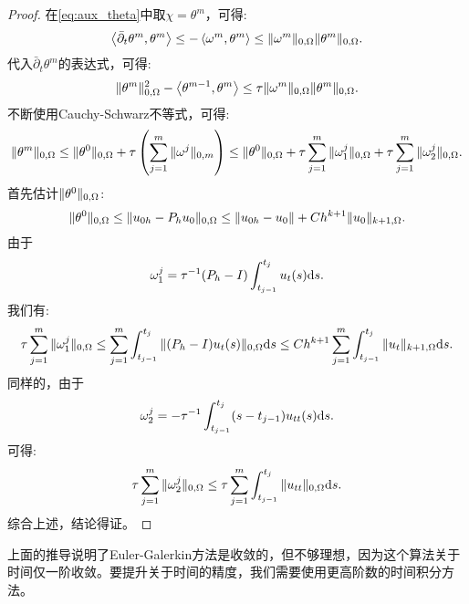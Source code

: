\begin{proof}
    在\eqref{eq:aux_theta}中取$\chi=\theta^{m}$，可得:
    \begin{equation}
        \left<\bar{\partial}_{t}\theta^{m},\theta^{m}\right>\le-\left<\omega^{m},\theta^{m}\right>\le\|\omega^{m}\|_{0,\Omega}\|\theta^{m}\|_{0,\Omega}.
    \end{equation}
    代入$\bar{\partial}_{t}\theta^{m}$的表达式，可得:
    \begin{equation}
        \|\theta^{m}\|_{0,\Omega}^{2}-\left<\theta^{m-1},\theta^{m}\right>\le\tau\|\omega^{m}\|_{0,\Omega}\|\theta^{m}\|_{0,\Omega}.
    \end{equation}
    不断使用Cauchy-Schwarz不等式，可得:
    \begin{equation}
        \|\theta^{m}\|_{0,\Omega}\le\|\theta^{0}\|_{0,\Omega}+\tau\left(\sum_{j=1}^{m}\|\omega^{j}\|_{0,m}\right)\le\|\theta^{0}\|_{0,\Omega}+\tau\sum_{j=1}^{m}\|\omega_{1}^{j}\|_{0,\Omega}+\tau\sum_{j=1}^{m}\|\omega_{2}^{j}\|_{0,\Omega}.
    \end{equation}
    首先估计$\|\theta^{0}\|_{0,\Omega}$:
    \begin{equation}
        \|\theta^{0}\|_{0,\Omega}\le\|u_{0h}-P_{h}u_{0}\|_{0,\Omega}\le\|u_{0h}-u_{0}\|+Ch^{k+1}\|u_{0}\|_{k+1,\Omega}.
    \end{equation}
    由于
    \begin{equation}
        \omega_{1}^{j}=\tau^{-1}(P_{h}-I)\int_{t_{j-1}}^{t_{j}}u_{t}(s)\mathrm{d} s.
    \end{equation}
    我们有:
    \begin{equation}
        \tau\sum_{j=1}^{m}\|\omega_{1}^{j}\|_{0,\Omega}\le\sum_{j=1}^{m}\int_{t_{j-1}}^{t_{j}}\|(P_{h}-I)u_{t}(s)\|_{0,\Omega}\mathrm{d} s\le Ch^{k+1}\sum_{j=1}^{m}\int_{t_{j-1}}^{t_{j}}\|u_{t}\|_{k+1,\Omega}\mathrm{d} s.
    \end{equation}
    同样的，由于
    \begin{equation}
        \omega_{2}^{j}=-\tau^{-1}\int_{t_{j-1}}^{t_{j}}(s-t_{j-1})u_{tt}(s)\mathrm{d} s.
    \end{equation}
    可得:
    \begin{equation}
        \tau\sum_{j=1}^{m}\|\omega_{2}^{j}\|_{0,\Omega}\le\tau\sum_{j=1}^{m}\int_{t_{j-1}}^{t_{j}}\|u_{tt}\|_{0,\Omega}\mathrm{d} s.
    \end{equation}
    综合上述，结论得证。
\end{proof}
\begin{remark}
    上面的推导说明了Euler-Galerkin方法是收敛的，但不够理想，因为这个算法关于时间仅一阶收敛。要提升关于时间的精度，我们需要使用更高阶数的时间积分方法。
\end{remark}